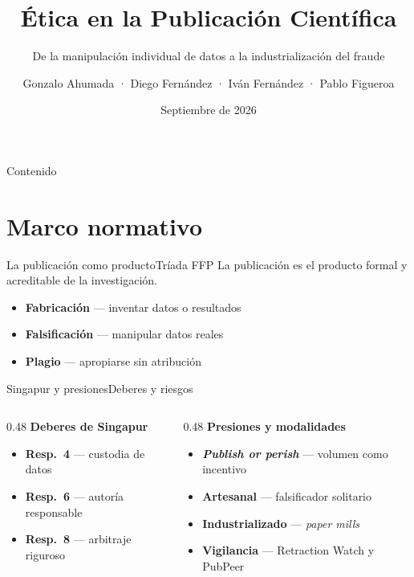 \documentclass[11pt,aspectratio=169,xcolor=table]{beamer}
\title[Ética en la publicación científica]{Ética en la Publicación Científica}
\subtitle{De la manipulación individual de datos a la industrialización del fraude}
\author[G.~Ahumada · D.~Fernández · I.~Fernández · P.~Figueroa]{%
  Gonzalo Ahumada · Diego Fernández · Iván Fernández · Pablo Figueroa}
\date{Septiembre de 2026}
\institute[USACH]{Universidad de Santiago de Chile}
\newcommand{\iconitem}[4][usachrojo]{%
  \item[\textcolor{#1}{#2}] \textbf{#3} — #4}
\begin{document}
\usachportada
{}

\begin{frame}{Contenido}
  \tableofcontents
\end{frame}

\section{Marco normativo}

\begin{frame}{La publicación como producto}{Tríada FFP}
  La publicación es el producto formal y acreditable de la investigación.
  \begin{itemize}\usachaire
    \iconitem[usachrojo]{\faFlask}{Fabricación}{inventar datos o resultados}
    \iconitem[usachnaranjo]{\faPencilSquareO}{Falsificación}{manipular datos reales}
    \iconitem[usachpurpura]{\faCopy}{Plagio}{apropiarse sin atribución}
  \end{itemize}
\end{frame}

\begin{frame}{Singapur y presiones}{Deberes y riesgos}
  \begin{columns}[T,onlytextwidth]
    \begin{column}{0.48\textwidth}
      \textbf{Deberes de Singapur}
      \begin{itemize}\usachaire
        \iconitem[usachverde]{\faDatabase}{Resp.~4}{custodia de datos}
        \iconitem[usachverde]{\faUsers}{Resp.~6}{autoría responsable}
        \iconitem[usachverde]{\faEye}{Resp.~8}{arbitraje riguroso}
      \end{itemize}
    \end{column}
    \begin{column}{0.48\textwidth}
      \textbf{Presiones y modalidades}
      \begin{itemize}\usachaire
        \iconitem[usachrojo]{\faLineChart}{\emph{Publish or perish}}{volumen como incentivo}
        \iconitem[usachrojo]{\faUserSecret}{Artesanal}{falsificador solitario}
        \iconitem[usachrojo]{\faIndustry}{Industrializado}{\emph{paper mills}}
        \iconitem[usachrojo]{\faGlobe}{Vigilancia}{Retraction Watch y PubPeer}
      \end{itemize}
    \end{column}
  \end{columns}
\end{frame}
\end{document}
